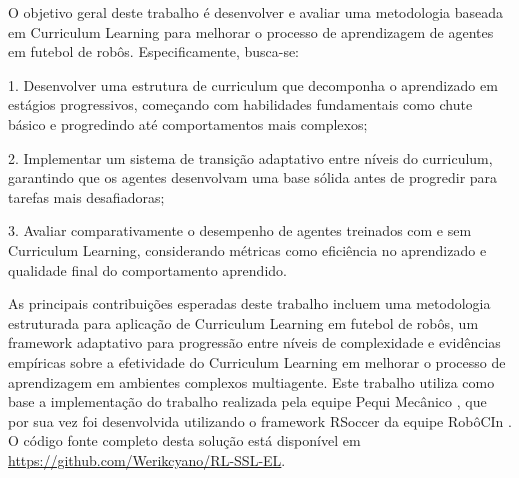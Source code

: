 O objetivo geral deste trabalho é desenvolver e avaliar uma metodologia baseada em Curriculum Learning para melhorar o processo de aprendizagem de agentes em futebol de robôs. Especificamente, busca-se:

1. Desenvolver uma estrutura de curriculum que decomponha o aprendizado em estágios progressivos, começando com habilidades fundamentais como chute básico e progredindo até comportamentos mais complexos;

2. Implementar um sistema de transição adaptativo entre níveis do curriculum, garantindo que os agentes desenvolvam uma base sólida antes de progredir para tarefas mais desafiadoras;

3. Avaliar comparativamente o desempenho de agentes treinados com e sem Curriculum Learning, considerando métricas como eficiência no aprendizado e qualidade final do comportamento aprendido.

As principais contribuições esperadas deste trabalho incluem uma metodologia estruturada para aplicação de Curriculum Learning em futebol de robôs, um framework adaptativo para progressão entre níveis de complexidade e evidências empíricas sobre a efetividade do Curriculum Learning em melhorar o processo de aprendizagem em ambientes complexos multiagente. Este trabalho utiliza como base a implementação do trabalho \cite{bruno_brandao} realizada pela equipe Pequi Mecânico \cite{pequi_mecanico}, que por sua vez foi desenvolvida utilizando o framework RSoccer \cite{rSoccer} da equipe RobôCIn \cite{robocin}. O código fonte completo desta solução está disponível em \url{https://github.com/Werikcyano/RL-SSL-EL}.
